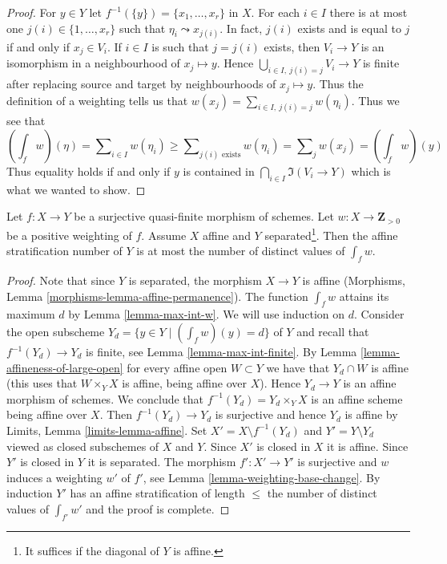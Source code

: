 \begin{proof}
\medskip\noindent
For $y \in Y$ let $f^{-1}(\{y\}) = \{x_1, \ldots, x_r\}$ in $X$.
For each $i \in I$ there is at most one $j(i) \in \{1, \ldots, x_r\}$
such that $\eta_i \leadsto x_{j(i)}$. In fact, $j(i)$ exists and is
equal to $j$ if and only if $x_j \in V_i$. If $i \in I$ is such that
$j = j(i)$ exists, then $V_i \to Y$ is an isomorphism in a neighbourhood
of $x_j \mapsto y$. Hence $\bigcup_{i \in I,\ j(i) = j} V_i \to Y$
is finite after replacing source and target by neighbourhoods of
$x_j \mapsto y$. Thus the definition of a weighting tells us that
$w(x_j) = \sum_{i \in I,\ j(i) = j} w(\eta_i)$.
Thus we see that
$$
(\textstyle{\int}_f w)(\eta) =
\sum\nolimits_{i \in I} w(\eta_i) \geq
\sum\nolimits_{j(i)\text{ exists}} w(\eta_i) =
\sum\nolimits_j w(x_j) = (\textstyle{\int}_f w)(y)
$$
Thus equality holds if and only if $y$ is contained in
$\bigcap_{i \in I} \Im(V_i \to Y)$ which is what we wanted to show.
\end{proof}

\begin{proposition}
\label{proposition-asn-weighting}
Let $f : X \to Y$ be a surjective quasi-finite morphism of schemes.
Let $w : X \to \mathbf{Z}_{> 0}$ be a positive weighting of $f$.
Assume $X$ affine and $Y$ separated\footnote{It suffices if the
diagonal of $Y$ is affine.}. Then the affine stratification
number of $Y$ is at most the number of distinct values of $\int_f w$.
\end{proposition}

\begin{proof}
Note that since $Y$ is separated, the morphism $X \to Y$ is affine
(Morphisms, Lemma \ref{morphisms-lemma-affine-permanence}).
The function $\int_f w$ attains its maximum $d$ by
Lemma \ref{lemma-max-int-w}. We will use induction on $d$.
Consider the open subscheme $Y_d = \{y \in Y \mid (\int_f w)(y) = d\}$
of $Y$ and recall that $f^{-1}(Y_d) \to Y_d$ is finite, see
Lemma \ref{lemma-max-int-finite}.
By Lemma \ref{lemma-affineness-of-large-open}
for every affine open $W \subset Y$ we have that $Y_d \cap W$ is affine
(this uses that $W \times_Y X$ is affine, being affine over $X$).
Hence $Y_d \to Y$ is an affine morphism of schemes. We
conclude that $f^{-1}(Y_d) = Y_d \times_Y X$ is
an affine scheme being affine over $X$.
Then $f^{-1}(Y_d) \to Y_d$ is surjective and
hence $Y_d$ is affine by Limits, Lemma \ref{limits-lemma-affine}.
Set $X' = X \setminus f^{-1}(Y_d)$ and $Y' = Y \setminus Y_d$
viewed as closed subschemes of $X$ and $Y$.
Since $X'$ is closed in $X$ it is affine. Since
$Y'$ is closed in $Y$ it is separated.
The morphism $f' : X' \to Y'$ is surjective and
$w$ induces a weighting $w'$ of $f'$, see
Lemma \ref{lemma-weighting-base-change}.
By induction $Y'$ has an affine stratification of
length $\leq$ the number of distinct values of
$\int_{f'} w'$ and the proof is complete.
\end{proof}











